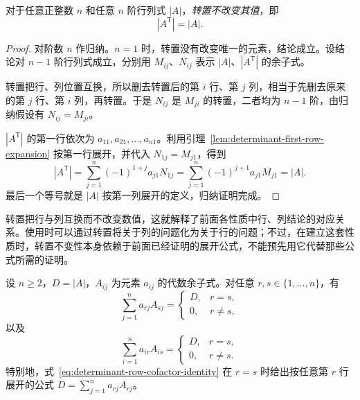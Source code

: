 \begin{property}[转置不改变行列式的值]
\label{prop:determinant-transpose}
对于任意正整数 $n$ 和任意 $n$ 阶行列式 $|A|$，\emph{转置不改变其值}，即
\[
    |A^{\mathsf T}|=|A|.
\]
\end{property}

\begin{proof}
对阶数 $n$ 作归纳。$n=1$ 时，转置没有改变唯一的元素，结论成立。设结论对 $n-1$ 阶行列式成立，分别用 $M_{ij}$、$N_{ij}$ 表示 $|A|$、$|A^{\mathsf T}|$ 的余子式。

转置把行、列位置互换，所以删去转置后的第 $i$ 行、第 $j$ 列，相当于先删去原来的第 $j$ 行、第 $i$ 列，再转置。于是 $N_{ij}$ 是 $M_{ji}$ 的转置，二者均为 $n-1$ 阶，由归纳假设有 $N_{ij}=M_{ji}$。

$|A^{\mathsf T}|$ 的第一行依次为 $a_{11},a_{21},\ldots,a_{n1}$。利用引理~\ref{lem:determinant-first-row-expansion} 按第一行展开，并代入 $N_{1j}=M_{j1}$，得到
\[
    |A^{\mathsf T}|
    =\sum_{j=1}^{n}(-1)^{1+j}a_{j1}N_{1j}
    =\sum_{j=1}^{n}(-1)^{j+1}a_{j1}M_{j1}
    =|A|.
\]
最后一个等号就是 $|A|$ 按第一列展开的定义，归纳证明完成。
\end{proof}

转置把行与列互换而不改变数值，这就解释了前面各性质中行、列结论的对应关系。使用时可以通过转置将关于列的问题化为关于行的问题；不过，在建立这套性质时，转置不变性本身依赖于前面已经证明的展开公式，不能预先用它代替那些公式所需的证明。


\begin{theorem}
\label{thm:determinant-cofactor-identities}
设 $n\geq2$，$D=|A|$，$A_{ij}$ 为元素 $a_{ij}$ 的代数余子式。对任意 $r,s\in\{1,\ldots,n\}$，有
\begin{equation}
\label{eq:determinant-row-cofactor-identity}
    \sum_{j=1}^{n}a_{rj}A_{sj}
    =\begin{cases}D,&r=s,\\0,&r\ne s,\end{cases}
\end{equation}
以及
\begin{equation}
\label{eq:determinant-column-cofactor-identity}
    \sum_{i=1}^{n}a_{ir}A_{is}
    =\begin{cases}D,&r=s,\\0,&r\ne s.\end{cases}
\end{equation}
特别地，式~\eqref{eq:determinant-row-cofactor-identity} 在 $r=s$ 时给出按任意第 $r$ 行展开的公式 $D=\sum_{j=1}^{n}a_{rj}A_{rj}$。
\end{theorem}

